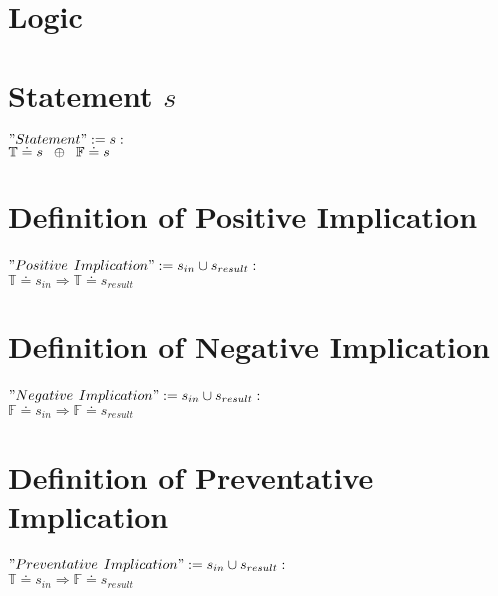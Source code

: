 \documentclass[11pt]{article}
\begin{document}
\section*{Logic}


\section{Statement $s$}
\begin{center}
$
"Statement" := s:
$
\\ \vspace{2mm}
$
\mathbb{T} \doteq s\hspace{2mm} \oplus \hspace{2mm} \mathbb{F} \doteq s
$
\end{center}




\section{Definition of Positive Implication}
\begin{center}
$
"Positive$ $Implication" := s_{in} \cup s_{result}:
$
\\ \vspace{2mm}
$
\mathbb{T} \doteq s_{in} \Rightarrow \mathbb{T} \doteq s_{result}
$
\end{center}



\section{Definition of Negative Implication}
\begin{center}
$
"Negative$ $Implication" := s_{in} \cup s_{result}:
$
\\ \vspace{2mm}
$
\mathbb{F} \doteq s_{in} \Rightarrow \mathbb{F} \doteq s_{result}
$
\end{center}




\section{Definition of Preventative Implication}
\begin{center}
$
"Preventative$ $Implication" := s_{in} \cup s_{result}:
$
\\ \vspace{2mm}
$
\mathbb{T} \doteq s_{in} \Rightarrow \mathbb{F} \doteq s_{result}
$
\end{center}
\end{document}
